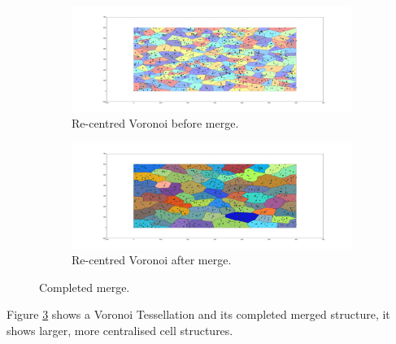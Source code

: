 \begin{figure}[H]
\begin{subfigure}[b]{0.5\textwidth}
  \includegraphics[width=\textwidth]{Images/merge1.png}
  \caption{Re-centred Voronoi before merge.}
  \label{fig:merge1}
\end{subfigure}
\hfill
\begin{subfigure}[b]{0.5\textwidth}
  \includegraphics[width=\textwidth]{Images/merge2.png}
  \caption{Re-centred Voronoi after merge.}
  \label{fig:merge2}
\end{subfigure}
\caption{Completed merge.}
\label{fig:merge}
\end{figure}
Figure \ref{fig:merge} shows a Voronoi Tessellation and its completed merged structure, it shows larger, more centralised cell structures.